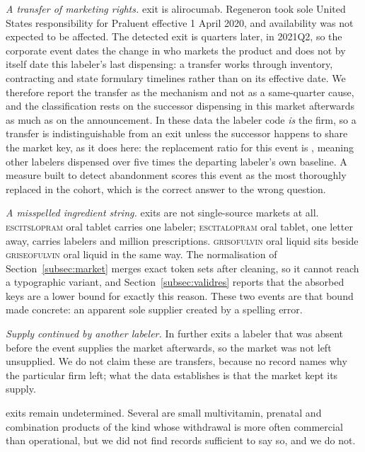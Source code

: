 \documentclass[pdflatex,sn-vancouver-num,Numbered]{sn-jnl}
\begin{document}
\emph{A transfer of marketing rights.} \nCauseTransferUC exit is alirocumab. Regeneron took sole
United States responsibility for Praluent effective 1 April 2020, and availability was not
expected to be affected. The detected exit is \nTransferGapQ quarters later, in 2021Q2, so the
corporate event dates the change in who markets the product and does not by itself date this
labeler's last dispensing: a transfer works through inventory, contracting and state formulary
timelines rather than on its effective date. We therefore report the transfer as the mechanism
and not as a same-quarter cause, and the classification rests on the successor dispensing in
this market afterwards as much as on the announcement. In these data the labeler code \emph{is}
the firm, so a transfer is
indistinguishable from an exit unless the successor happens to share the market key, as it does
here: the replacement ratio for this event is \nTransferR, meaning other labelers dispensed over
five times the departing labeler's own baseline. A measure built to detect abandonment scores
this event as the most thoroughly replaced in the cohort, which is the correct answer to the
wrong question.

\emph{A misspelled ingredient string.} \nCauseArtefactUC exits are not single-source markets at
all. \textsc{escitslopram} oral tablet carries one labeler; \textsc{escitalopram} oral tablet,
one letter away, carries \nEscitalopramLabelers labelers and \nEscitalopramRx million
prescriptions. \textsc{grisofulvin} oral liquid sits beside \textsc{griseofulvin} oral liquid in
the same way. The normalisation of Section~\ref{subsec:market} merges exact token sets after
cleaning, so it cannot reach a typographic variant, and Section~\ref{subsec:validres} reports
that the \nKeysAbsorbed absorbed keys are a lower bound for exactly this reason. These two events
are that bound made concrete: an apparent sole supplier created by a spelling error.

\emph{Supply continued by another labeler.} In \nCauseContinuedW further exits a labeler that was
absent before the event supplies the market afterwards, so the market was not left unsupplied. We
do not claim these are transfers, because no record names why the particular firm left; what the
data establishes is that the market kept its supply.

\nCauseUndeterminedUC exits remain undetermined. Several are small multivitamin, prenatal and
combination products of the kind whose withdrawal is more often commercial than operational, but
we did not find records sufficient to say so, and we do not.
\end{document}
